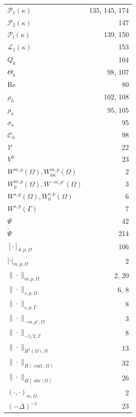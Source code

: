 \begin{minipage}[t]{0.48\textwidth}
\begin{tabular}{@{}lr@{}}
$\mathcal P_1(\kappa)$ & 135, 145, 174\\
$\mathcal P_2(\kappa)$ & 147\\
$\mathcal P_l(\kappa)$ & 139, 150\\
$\mathcal L_1(\kappa)$ & 153\\
$Q_k$ & 104\\
$\Theta_h$ & 98, 107\\
$\mathrm{Re}$ & 80\\
$\rho_h$ & 102, 108\\
$\rho_\kappa$ & 95, 105\\
$\sigma_\kappa$ & 95\\
$\mathcal C_h$ & 98\\
$\mathcal V$ & 22\\
$V^0$ & 23\\
$W^{m,p}(\Omega),W_{\mathrm{loc}}^{m,p}(\Omega)$ & 2\\
$W_0^{m,p}(\Omega),W^{-m,p'}(\Omega)$ & 3\\
$W^{s,p}(\Omega),W_0^{s,p}(\Omega)$ & 6\\
$W^{s,p}(\Gamma)$ & 7\\
$\Psi$ & 42\\
$\widetilde\Psi$ & 214\\
$[\cdot]_{k,p,\Omega}$ & 106\\
$|\cdot|_{m,p,\Omega}$ & 2\\
$\|\cdot\|_{m,p,\Omega}$ & 2, 20\\
$\|\cdot\|_{s,p,\Omega}$ & 6, 8\\
$\|\cdot\|_{s,p,\Gamma}$ & 8\\
$\|\cdot\|_{-m,p',\Omega}$ & 3\\
$\|\cdot\|_{-1/2,\Gamma}$ & 8\\
$\|\cdot\|_{H^1(\Omega)/\mathbb R}$ & 13\\
$\|\cdot\|_{H(\operatorname{curl};\Omega)}$ & 32\\
$\|\cdot\|_{H(\operatorname{div};\Omega)}$ & 26\\
$(\cdot,\cdot)_{m,\Omega}$ & 2\\
$(-\Delta)^{-1}$ & 23\\
\end{tabular}
\end{minipage}
\normalsize

